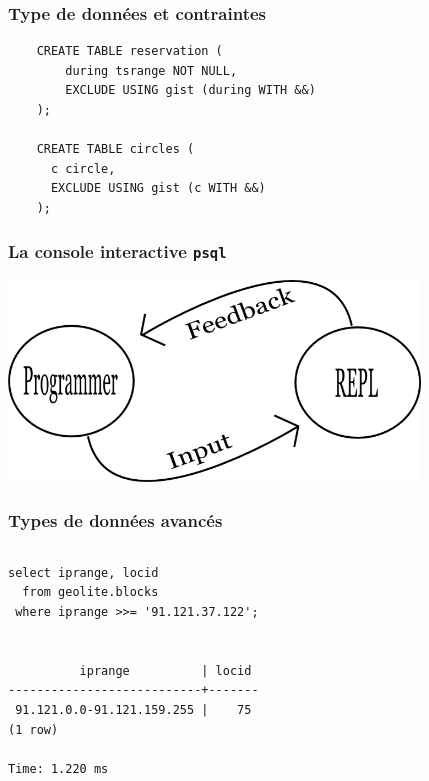 \documentclass{beamer}
\begin{document}
\begin{frame}[fragile]
  \frametitle{Type de données et contraintes}

  \begin{verbatim}
    CREATE TABLE reservation (
        during tsrange NOT NULL,
        EXCLUDE USING gist (during WITH &&)
    );
    
    CREATE TABLE circles (
      c circle,
      EXCLUDE USING gist (c WITH &&)
    );
  \end{verbatim}
\end{frame}

\begin{frame}
  \frametitle{La console interactive \texttt{psql}}

  \begin{center}
    \includegraphics[height=2.1in]{repl.png}
  \end{center}
\end{frame}

\begin{frame}[fragile]
  \frametitle{Types de données avancés}

\begin{columns}
\begin{verbatim}
select iprange, locid
  from geolite.blocks
 where iprange >>= '91.121.37.122';


          iprange          | locid 
---------------------------+-------
 91.121.0.0-91.121.159.255 |    75
(1 row)

Time: 1.220 ms
\end{verbatim}
\end{columns}
\end{frame}
\end{document}
